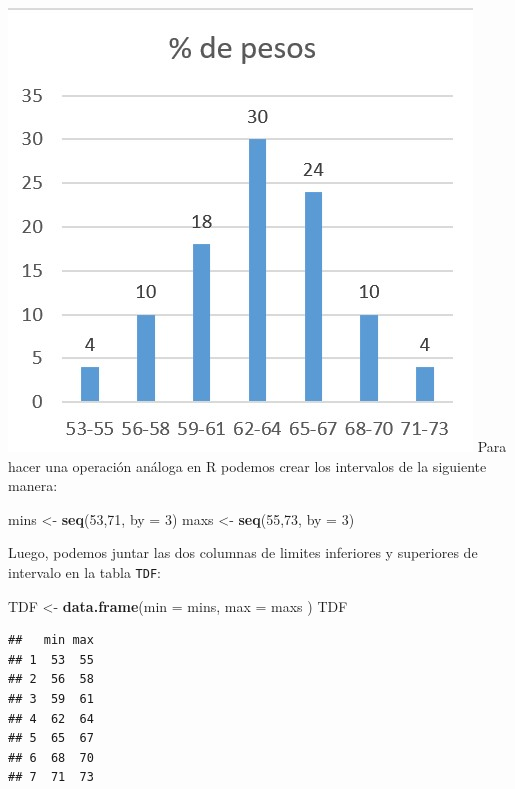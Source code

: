 \documentclass[twocolumn]{article}
\newenvironment{Shaded}{\begin{snugshade}}{\end{snugshade}}
\newcommand{\KeywordTok}[1]{\textcolor[rgb]{0.13,0.29,0.53}{\textbf{#1}}}
\newcommand{\DataTypeTok}[1]{\textcolor[rgb]{0.13,0.29,0.53}{#1}}
\newcommand{\DecValTok}[1]{\textcolor[rgb]{0.00,0.00,0.81}{#1}}
\newcommand{\StringTok}[1]{\textcolor[rgb]{0.31,0.60,0.02}{#1}}
\newcommand{\NormalTok}[1]{#1}
\begin{document}
\includegraphics{./img/histogramaPorcentajes.jpg} Para hacer una
operación análoga en R podemos crear los intervalos de la siguiente
manera:

\begin{Shaded}
\begin{Highlighting}[]
\NormalTok{mins <-}\StringTok{ }\KeywordTok{seq}\NormalTok{(}\DecValTok{53}\NormalTok{,}\DecValTok{71}\NormalTok{, }\DataTypeTok{by =} \DecValTok{3}\NormalTok{)}
\NormalTok{maxs <-}\StringTok{ }\KeywordTok{seq}\NormalTok{(}\DecValTok{55}\NormalTok{,}\DecValTok{73}\NormalTok{, }\DataTypeTok{by =} \DecValTok{3}\NormalTok{)}
\end{Highlighting}
\end{Shaded}

Luego, podemos juntar las dos columnas de limites inferiores y
superiores de intervalo en la tabla \texttt{TDF}:

\begin{Shaded}
\begin{Highlighting}[]
\NormalTok{TDF <-}\StringTok{ }\KeywordTok{data.frame}\NormalTok{(}\DataTypeTok{min =}\NormalTok{ mins,}
                                 \DataTypeTok{max =}\NormalTok{ maxs )}
\NormalTok{TDF}
\end{Highlighting}
\end{Shaded}

\begin{verbatim}
##   min max
## 1  53  55
## 2  56  58
## 3  59  61
## 4  62  64
## 5  65  67
## 6  68  70
## 7  71  73
\end{verbatim}
\end{document}
